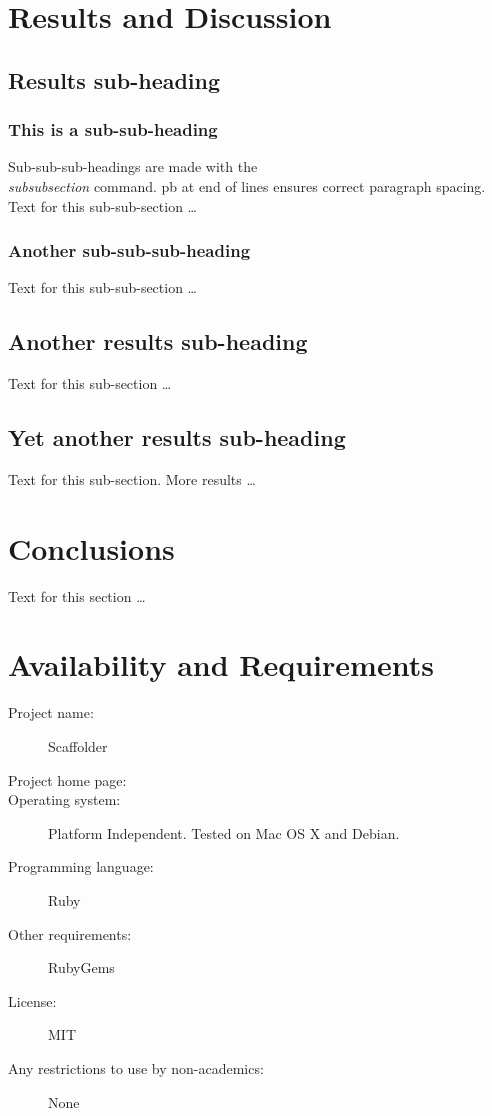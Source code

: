 \documentclass[10pt]{bmc_article}
\newenvironment{bmcformat}{\begin{raggedright}\baselineskip20pt\sloppy\setboolean{publ}{false}}{\end{raggedright}\baselineskip20pt\sloppy}
\begin{document}
\begin{bmcformat}
\section*{Results and Discussion} %
  \subsection*{Results sub-heading}
    \subsubsection*{This is a sub-sub-heading}
      Sub-sub-sub-headings are made with the \textsl{\\subsubsection} command. \pb
      pb at end of lines ensures correct paragraph spacing.\pb
	  Text for this sub-sub-section \ldots
    \subsubsection*{Another sub-sub-sub-heading}
      Text for this sub-sub-section \ldots

  \subsection*{Another results sub-heading}
    Text for this sub-section \ldots

  \subsection*{Yet another results sub-heading}
    Text for this sub-section.  More results \ldots
\section*{Conclusions}
  Text for this section \ldots
\section*{Availability and Requirements}

  \begin{description}
    \item[Project name:] Scaffolder
    \item[Project home page:] \scaffolder
    \item[Operating system:] Platform Independent. Tested on Mac OS X and
    Debian.
    \item[Programming language:] Ruby
    \item[Other requirements:] RubyGems
    \item[License:] MIT
    \item[Any restrictions to use by non-academics:] None
  \end{description}


\end{bmcformat}
\end{document}

